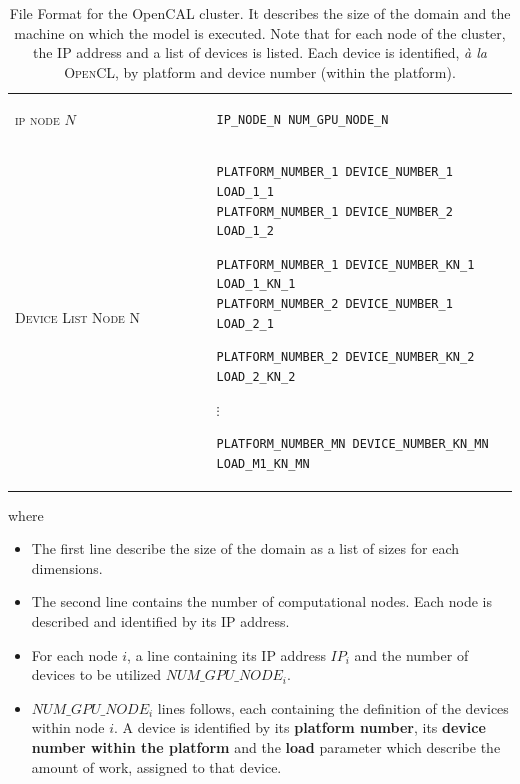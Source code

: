 \begin{table}
\begin{tabular}{m{0.4\linewidth} m{0.7\linewidth}}
\tabularnewline
\midrule


\textsc{ip node $N$}   & 
\begin{verbatim}
IP_NODE_N NUM_GPU_NODE_N
\end{verbatim}
\tabularnewline
\textsc{Device List Node N}  & 
\begin{verbatim}
PLATFORM_NUMBER_1 DEVICE_NUMBER_1 LOAD_1_1
PLATFORM_NUMBER_1 DEVICE_NUMBER_2 LOAD_1_2
\end{verbatim}
\centering {$\vdots$}
\begin{verbatim}
PLATFORM_NUMBER_1 DEVICE_NUMBER_KN_1 LOAD_1_KN_1
PLATFORM_NUMBER_2 DEVICE_NUMBER_1  LOAD_2_1
\end{verbatim}
\centering {$\vdots$}
\begin{verbatim}
PLATFORM_NUMBER_2 DEVICE_NUMBER_KN_2 LOAD_2_KN_2
\end{verbatim}
\begin{center}
	{$\vdots$}
\end{center}
\begin{verbatim}
PLATFORM_NUMBER_MN DEVICE_NUMBER_KN_MN LOAD_M1_KN_MN
\end{verbatim}

		
\end{tabular}
\caption{File Format for  the OpenCAL cluster. It describes the size of the domain and the machine on which the model is executed. Note that for each node of the cluster, the IP address and a list of devices is listed. Each device is identified, \textit{\`a la} \textsc{OpenCL}, by platform and device number (within the platform).}
\end{table}
\captionsetup[table]{name=Table}


where
\begin{itemize}
	\item The first line describe the size of the domain as a list of sizes for each dimensions.
	\item The second line contains the number of computational nodes. Each node is described and identified by its IP address.
	\item For each node $i$, a line containing its IP address $IP_i$ and the number of devices to be utilized $NUM\_GPU\_NODE_i$.
   \item $NUM\_GPU\_NODE_i$ lines follows, each containing the definition of the devices within node $i$. A device is identified by its \textbf{platform number}, its  \textbf{device number within the platform} and the \textbf{load} parameter which describe the amount of work, assigned to that device.
	 
\end{itemize}


